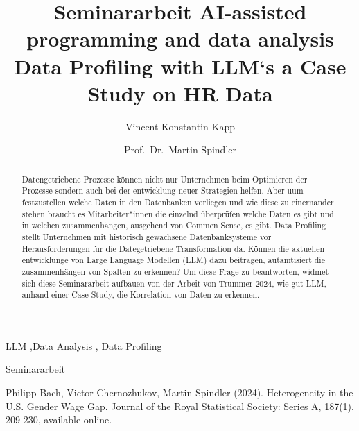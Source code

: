 \documentclass[
  11pt,
  authoryear,
  preprint]{elsarticle}
\begin{document}
\begin{frontmatter}
\title{Seminararbeit AI-assisted programming and data
analysis \\\large{Data Profiling with LLM`s a Case Study on HR Data} }
\author[1]{Vincent-Konstantin Kapp%
%
}
\author[2]{Prof.~Dr.~Martin Spindler%
%
}


        
\begin{abstract}
Datengetriebene Prozesse können nicht nur Unternehmen beim Optimieren
der Prozesse sondern auch bei der entwicklung neuer Strategien helfen.
Aber uum festzustellen welche Daten in den Datenbanken vorliegen und wie
diese zu einernander stehen braucht es Mitarbeiter*innen die einzelnd
überprüfen welche Daten es gibt und in welchen zusammenhängen, ausgehend
von Commen Sense, es gibt. Data Profiling stellt Unternehmen mit
historisch gewachsene Datenbanksysteme vor Herausforderungen für die
Dategetriebene Transformation da. Können die aktuellen entwicklunge von
Large Language Modellen (LLM) dazu beitragen, autamtisiert die
zusammenhängen von Spalten zu erkennen? Um diese Frage zu beantworten,
widmet sich diese Seminararbeit aufbauen von der Arbeit von Trummer
2024, wie gut LLM, anhand einer Case Study, die Korrelation von Daten zu
erkennen.
\end{abstract}





\begin{keyword}
    LLM \sep Data Analysis \sep 
    Data Profiling
\end{keyword}
\end{frontmatter}
    
Seminararbeit

Philipp Bach, Victor Chernozhukov, Martin Spindler (2024). Heterogeneity
in the U.S. Gender Wage Gap. Journal of the Royal Statistical Society:
Series A, 187(1), 209-230, available online.
\end{document}
